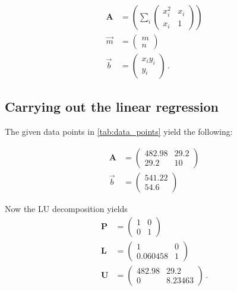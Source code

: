 \begin{align*}
    \symbf{A} &= 
    \left( \sum_i 
    \begin{pmatrix}
        x_i^2 & x_i \\
        x_i & 1
    \end{pmatrix} \right) \\
    \vec{m} &=
    \begin{pmatrix}
        m \\
        n
    \end{pmatrix} \\
    \vec{b} &=
    \begin{pmatrix}
        x_i y_i \\
        y_i
    \end{pmatrix} \, .
\end{align*}

\subsection{Carrying out the linear regression}

The given data points in \autoref{tab:data_points} yield the following:

\begin{align*}
    \symbf{A} &=
    \begin{pmatrix}
        482.98 & 29.2 \\
        29.2 & 10
    \end{pmatrix}\\
    \vec{b} &=
    \begin{pmatrix}
        541.22 \\
        54.6
    \end{pmatrix}
\end{align*}

Now the LU decomposition yields
\begin{align*}
    \symbf{P} &=
    \begin{pmatrix}
        1 & 0 \\
        0 & 1
    \end{pmatrix} \\
    \symbf{L} &=
    \begin{pmatrix}
        1 & 0 \\
        0.060458 & 1
    \end{pmatrix} \\
    \symbf{U} &=
    \begin{pmatrix}
        482.98 & 29.2 \\
        0 & 8.23463
    \end{pmatrix} \, .
\end{align*}

